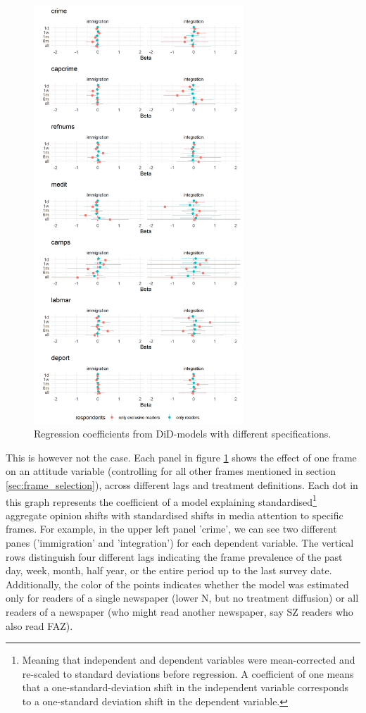 \documentclass{article}
\begin{document}
\begin{figure}
    \centering
    \includegraphics[width=0.7\textwidth]{paper/vis/effectplot_frames_did.png}
    \caption{Regression coefficients from DiD-models with different specifications.}
    \label{fig:did_corr}
\end{figure}

This is however not the case. Each panel in figure \ref{fig:did_corr} shows the effect of one frame on an attitude variable (controlling for all other frames mentioned in section \ref{sec:frame_selection}), across different lags and treatment definitions. Each dot in this graph represents the coefficient of a model explaining standardised\footnote{Meaning that independent and dependent variables were mean-corrected and re-scaled to standard deviations before regression. A coefficient of one means that a one-standard-deviation shift in the independent variable corresponds to a one-standard deviation shift in the dependent variable.} aggregate opinion shifts with standardised shifts in media attention to specific frames.  For example, in the upper left panel 'crime', we can see two different panes ('immigration' and 'integration') for each dependent variable. The vertical rows distinguish four different lags indicating the frame prevalence of the past day, week, month, half year, or the entire period up to the last survey date. Additionally, the color of the points indicates whether the model was estimated only for readers of a single newspaper (lower N, but no treatment diffusion) or all readers of a newspaper (who might read another newspaper, say SZ readers who also read FAZ). 
\end{document}
